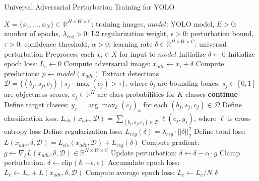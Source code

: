 \documentclass[../main.tex]{subfiles}
\begin{document}
\begin{breakablealgorithm}{Universal Adversarial Perturbation Training for YOLO}
\begin{algorithmic}[1]
\Require $X = \{x_1, \dots, x_N\} \subset \mathbb{R}^{H \times W \times C}$: training images, $model$: YOLO model, $E > 0$: number of epochs, $\lambda_{reg} > 0$: L2 regularization weight, $\epsilon > 0$: perturbation bound, $\tau > 0$: confidence threshold, $\alpha > 0$: learning rate
\Ensure $\delta \in \mathbb{R}^{H \times W \times C}$: universal perturbation
\State Preprocess each $x_i \in X$ for input to $model$ 
\State Initialize $\delta \gets 0$ 
    \State Initialize epoch loss: $L_e \gets 0$
        \State Compute adversarial image: $x_{adv} \gets x_i + \delta$
        \State Compute predictions: $p \gets model(x_{adv})$ 
        \State Extract detections $\mathcal{D} = \{ (b_j, s_j, c_j) \mid s_j \cdot \max(c_j) > \tau \}$, where $b_j$ are bounding boxes, $s_j \in [0, 1]$ are objectness scores, $c_j \in \mathbb{R}^K$ are class probabilities for $K$ classes
            \State \textbf{continue} 
        \EndIf
        \State Define target classes: $y_j = \arg\max_k (c_j)_k$ for each $(b_j, s_j, c_j) \in \mathcal{D}$
        \State Define classification loss: $L_{cls}(x_{adv}, \mathcal{D}) = \sum_{(b_j, s_j, c_j) \in \mathcal{D}} \ell(c_j, y_j)$, where $\ell$ is cross-entropy loss
        \State Define regularization loss: $L_{reg}(\delta) = \lambda_{reg} \cdot ||\delta||_2^2$ 
        \State Define total loss: $L(x_{adv}, \delta, \mathcal{D}) = L_{cls}(x_{adv}, \mathcal{D}) + L_{reg}(\delta)$
        \State Compute gradient: $g \gets \nabla_{\delta} L(x_{adv}, \delta, \mathcal{D}) \in \mathbb{R}^{H \times W \times C}$ 
        \State Update perturbation: $\delta \gets \delta - \alpha \cdot g$ 
        \State Clamp perturbation: $\delta \gets \text{clip}(\delta, -\epsilon, \epsilon)$ 
        \State Accumulate epoch loss: $L_e \gets L_e + L(x_{adv}, \delta, \mathcal{D})$
    \EndFor
    \State Compute average epoch loss: $L_e \gets L_e / N$
\EndFor
\State \Return $\delta$
\end{algorithmic}
\end{breakablealgorithm}
\end{document}
